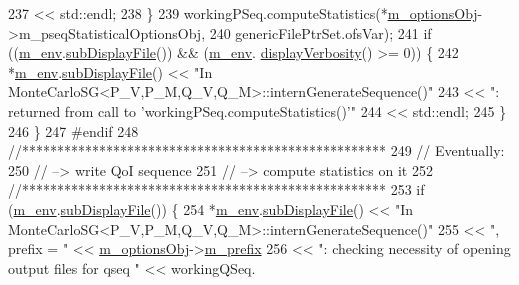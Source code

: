 \begin{DoxyCode}
237                               << std::endl;
238     \}
239     workingPSeq.computeStatistics(*\hyperlink{class_q_u_e_s_o_1_1_monte_carlo_s_g_acf7ce935648fd3a5d0ee23685708b4ca}{m\_optionsObj}->m\_pseqStatisticalOptionsObj,
240                                   genericFilePtrSet.ofsVar);
241     \textcolor{keywordflow}{if} ((\hyperlink{class_q_u_e_s_o_1_1_monte_carlo_s_g_a30055a359b22cde54681679aed8ae6e7}{m\_env}.\hyperlink{class_q_u_e_s_o_1_1_base_environment_a8a0064746ae8dddfece4229b9ad374d6}{subDisplayFile}()) && (\hyperlink{class_q_u_e_s_o_1_1_monte_carlo_s_g_a30055a359b22cde54681679aed8ae6e7}{m\_env}.
      \hyperlink{class_q_u_e_s_o_1_1_base_environment_a1fe5f244fc0316a0ab3e37463f108b96}{displayVerbosity}() >= 0)) \{
242       *\hyperlink{class_q_u_e_s_o_1_1_monte_carlo_s_g_a30055a359b22cde54681679aed8ae6e7}{m\_env}.\hyperlink{class_q_u_e_s_o_1_1_base_environment_a8a0064746ae8dddfece4229b9ad374d6}{subDisplayFile}() << \textcolor{stringliteral}{"In
       MonteCarloSG<P\_V,P\_M,Q\_V,Q\_M>::internGenerateSequence()"}
243                               << \textcolor{stringliteral}{": returned from call to 'workingPSeq.computeStatistics()'"}
244                               << std::endl;
245     \}
246   \}
247 \textcolor{preprocessor}{#endif}
248 \textcolor{preprocessor}{}  \textcolor{comment}{//****************************************************}
249   \textcolor{comment}{// Eventually:}
250   \textcolor{comment}{// --> write QoI sequence}
251   \textcolor{comment}{// --> compute statistics on it}
252   \textcolor{comment}{//****************************************************}
253   \textcolor{keywordflow}{if} (\hyperlink{class_q_u_e_s_o_1_1_monte_carlo_s_g_a30055a359b22cde54681679aed8ae6e7}{m\_env}.\hyperlink{class_q_u_e_s_o_1_1_base_environment_a8a0064746ae8dddfece4229b9ad374d6}{subDisplayFile}()) \{
254     *\hyperlink{class_q_u_e_s_o_1_1_monte_carlo_s_g_a30055a359b22cde54681679aed8ae6e7}{m\_env}.\hyperlink{class_q_u_e_s_o_1_1_base_environment_a8a0064746ae8dddfece4229b9ad374d6}{subDisplayFile}() << \textcolor{stringliteral}{"In
       MonteCarloSG<P\_V,P\_M,Q\_V,Q\_M>::internGenerateSequence()"}
255                             << \textcolor{stringliteral}{", prefix = "}                                            << 
      \hyperlink{class_q_u_e_s_o_1_1_monte_carlo_s_g_acf7ce935648fd3a5d0ee23685708b4ca}{m\_optionsObj}->\hyperlink{class_q_u_e_s_o_1_1_monte_carlo_s_g_options_ac640fa60af7134d4113e9b7481a34f6c}{m\_prefix}
256                             << \textcolor{stringliteral}{": checking necessity of opening output files for qseq "} << workingQSeq.

\end{DoxyCode}
